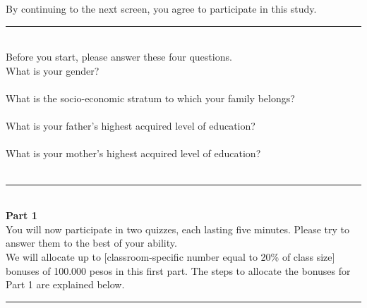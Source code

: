 \documentclass[11pt,a4paper,oneside]{article}
\begin{document}
\noindent  By continuing to the next screen, you agree to participate in this study.\\

\noindent\rule{\textwidth}{0.4pt}\\

\noindent Before you start, please answer these four questions. \\

\noindent What is your gender? \\ 

 \\

\noindent What is the socio-economic stratum to which your family belongs? \\

 \\

\noindent What is your father's highest acquired level of education?\\

 \\

\noindent What is your mother's highest acquired level of education?\\

 \\

\noindent\rule{\textwidth}{0.4pt}\\

\noindent \textbf{Part 1} \\

\noindent You will now participate in two quizzes, each lasting five minutes. Please try to answer them to the best of your ability. \\

\noindent We will allocate up to [classroom-specific number equal to 20\% of class size] bonuses of 100.000 pesos in this first part. The steps to allocate the bonuses for Part 1 are explained below.\\

\noindent\rule{\textwidth}{0.4pt}\\

 \\
\end{document}

